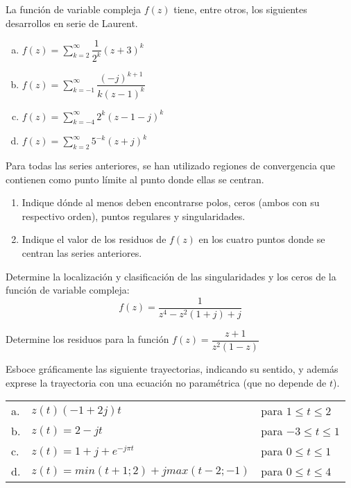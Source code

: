 \begin{ejercicio}
    La función de variable compleja $f(z)$ tiene, entre otros, los siguientes desarrollos en serie de Laurent.\par
    \begin{enumerate}[a.]
        \item $f(z)=\sum\limits_{k=2}^{\infty}\dfrac{1}{2^k}(z+3)^k$\\
        \item $f(z)=\sum\limits_{k=-1}^{\infty}\dfrac{(-j)^{k+1}}{k(z-1)^k}$\\
        \item $f(z)=\sum\limits_{k=-4}^{\infty}2^k(z-1-j)^k$\\
        \item $f(z)=\sum\limits_{k=2}^{\infty}5^{-k}(z+j)^k$
    \end{enumerate}
    Para todas las series anteriores, se han utilizado regiones de convergencia que contienen como punto límite al punto donde ellas se centran.

    \begin{enumerate}
        \item Indique dónde al menos deben encontrarse polos, ceros (ambos con su respectivo orden), puntos regulares y singularidades.
        \item Indique el valor de los residuos de $f(z)$ en los cuatro puntos donde se centran las series anteriores.
    \end{enumerate}
\end{ejercicio}

\begin{ejercicio}
    Determine la localización y clasificación de las singularidades y los ceros de la función de variable compleja:
    $$ f(z)=\dfrac{1}{z^4-z^2(1+j)+j} $$
\end{ejercicio}

\begin{ejercicio}
    Determine los residuos para la función $f(z)=\dfrac{z+1}{z^2(1-z)}$
\end{ejercicio}

\begin{ejercicio}
    Esboce gráficamente las siguiente trayectorias, indicando su sentido, y además exprese la trayectoria con una ecuación no paramétrica (que no depende de $t$).\par
    \hspace{3pt}
    \begin{tabular}{lll}
        a. & $z(t)(-1+2j)t$ & para $1 \leq t \leq 2 $\\
        b. & $z(t)=2-jt$ & para  $-3 \leq t \leq 1$\\
        c. & $z(t)=1+j+e^{-j\pi t}$ & para $0 \leq t \leq 1$\\
        d. & $z(t)=min(t+1;2)+j max(t-2;-1)$ & para $0 \leq t \leq 4$
    \end{tabular}
\end{ejercicio}

